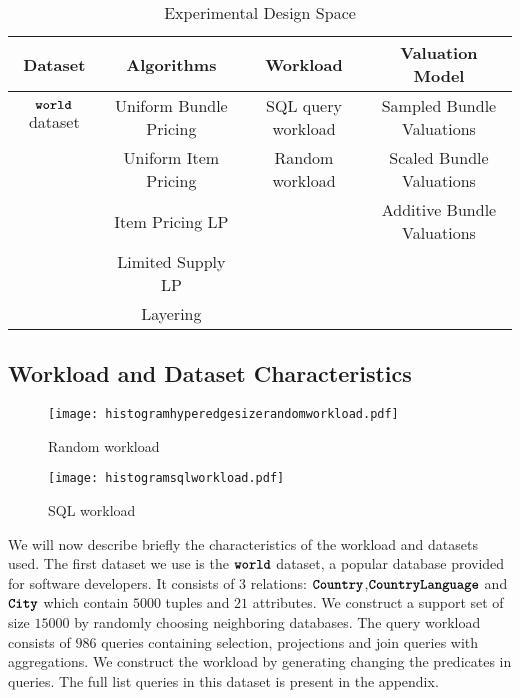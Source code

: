 \begin{table*} \centering
	\def\arraystretch{1.35}%
\begin{tabular}{c|c|c|c}
	\toprule
	\textbf{Dataset} & \textbf{Algorithms} & \textbf{Workload} & \textbf{Valuation Model}\\ \midrule
	$\texttt{\bfseries world}$ dataset & Uniform Bundle Pricing & SQL query workload & Sampled Bundle Valuations \\ 
	 & Uniform Item Pricing & Random workload & Scaled Bundle Valuations \\ 
 & Item Pricing LP &  & Additive Bundle Valuations \\ 
	 & Limited Supply LP & &  \\
	 	 & Layering &  &  \\
	\bottomrule
\end{tabular}
\caption{Experimental Design Space}
\label{table:experiments}
\end{table*}

\subsection{Workload and Dataset Characteristics}

\begin{figure}[!h]
	
	\begin{minipage}[t]{0.45\linewidth}
		\centering
		\texttt{[image: histogramhyperedgesizerandomworkload.pdf]}
		\caption{Random workload} \label{fig:histogramrandom}
	\end{minipage}
	\hspace{1cm}
	\begin{minipage}[t]{0.45\linewidth} 
		\centering
		\texttt{[image: histogramsqlworkload.pdf]}
		\caption{SQL workload} \label{fig:histogramrealqueries}
	\end{minipage}        
\end{figure}  

We will now describe briefly the characteristics of the workload and datasets used. The first dataset we use is the $\texttt{\bfseries world}$ dataset, a popular database provided for software developers. 
It consists of $3$ relations: $\texttt{\bfseries Country}$,$\texttt{\bfseries CountryLanguage}$ and $\texttt{\bfseries City}$ which contain $5000$ tuples and $21$ attributes. We construct a support set of size $15000$ by randomly choosing neighboring databases. 
The query workload consists of $986$ queries containing selection, projections and join queries with aggregations. We construct the workload by generating changing the predicates in queries. The full list queries in this dataset is present in the appendix.

